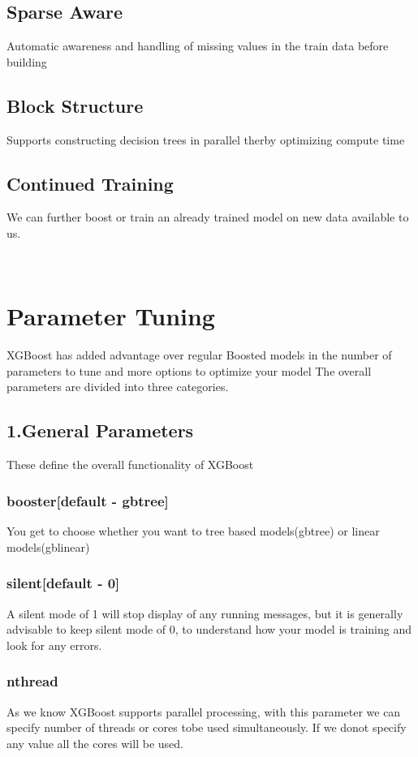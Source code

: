\subsection{Sparse Aware} Automatic awareness and handling of missing values in
the train data before building

\subsection{Block Structure}
Supports constructing decision trees in parallel therby optimizing compute time

\subsection{Continued Training} We can further boost or train an already trained
model on new data available to us.

~\cite{hid-sp18-401-XGBoost-MLmastery}

\section{Parameter Tuning} XGBoost has added advantage over regular Boosted
models in the number of parameters to tune and more options to optimize your
model The overall parameters are divided into three categories.

\subsection{1.General Parameters}
These define the overall functionality of XGBoost

\subsubsection{booster[default - gbtree]}  You get to choose whether you want to
tree based models(gbtree) or linear models(gblinear)

\subsubsection{silent[default - 0]} A silent mode of 1 will stop display of any
running messages, but it is generally advisable to keep silent mode of 0, to
understand how your model is training and look for any errors.

\subsubsection{nthread} As we know XGBoost supports parallel processing, with
this parameter we can specify number of threads or cores tobe used
simultaneously. If we donot specify any value all the cores will be used.

